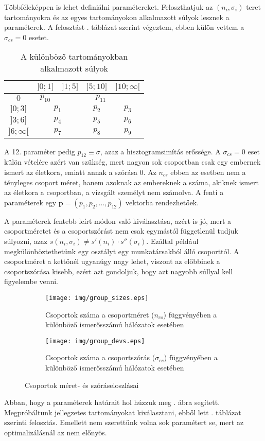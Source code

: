 \documentclass[12pt]{article}
\begin{document}
Többféleképpen is lehet definiálni paramétereket. Feloszthatjuk az $(n_i, \sigma_i)$ teret tartományokra és az egyes tartományokon alkalmazott súlyok lesznek a paraméterek. A felosztást . táblázat szerint végeztem, ebben külön vettem a $\sigma_{cs} = 0$ esetet.
\begin{table}[H]
	\centering
	\begin{tabular}{|c|c|c|c|c|}
		\hline
		\diagbox{$\sigma_{cs}$}{$n_{cs}$} & $]0;1]$ & $]1;5]$ & $]5;10]$ & $]10;\infty[$  \\
		\hline
		$0$ & $p_{10}$ & \multicolumn{3}{|c|}{$p_{11}$} \\
		\hline
		$]0;3]$ & \multicolumn{2}{|c|}{$p_1$} & $p_2$ & $p_3$ \\
		\hline
		$]3;6]$ & \multicolumn{2}{|c|}{$p_4$} & $p_5$ & $p_6$ \\
		\hline
		$]6;\infty[$  & \multicolumn{2}{|c|}{$p_7$} & $p_8$ & $p_9$ \\
		\hline
	\end{tabular}
	\caption{A különböző tartományokban alkalmazott súlyok}
	\label{felosztas}
\end{table}
\noindent
A 12. paraméter pedig $p_{12} \equiv \sigma$, azaz a hisztogramsimítás erőssége. A $\sigma_{cs} = 0$ eset külön vételére azért van szükség, mert nagyon sok csoportban csak egy embernek ismert az életkora, emiatt annak a szórása $0$. Az $n_{cs}$ ebben az esetben nem a tényleges csoport méret, hanem azoknak az embereknek a száma, akiknek ismert az életkora a csoportban, a vizsgált személyt nem számolva.
A fenti a paraméterek egy $\mathbf{p} = (p_1, p_2, ..., p_{12})$ vektorba rendezhetőek.

A paraméterek fentebb leírt módon való kiválasztása, azért is jó, mert a csoportméretet és a csoportszórást nem csak egymástól függetlenül tudjuk súlyozni, azaz $s(n_i, \sigma_i) \neq s'(n_i)\cdot s''(\sigma_i)$. Ezáltal például megkülönböztethetünk egy osztályt egy munkatársakból álló csoporttól. A csoportméret a kettőnél ugyanúgy nagy lehet, viszont az előbbinek a csoportszórása kisebb, ezért azt gondoljuk, hogy azt nagyobb súllyal kell figyelembe venni.
\begin{figure}[H]
	\centering
	\begin{subfigure}{0.49\textwidth}
		\texttt{[image: img/group\_sizes.eps]}
		\caption{Csoportok száma a csoportméret ($n_{cs}$) függvényében a különböző ismerősszámú hálózatok esetében}
	\end{subfigure} \hfill
	\begin{subfigure}{0.49\textwidth}
		\texttt{[image: img/group\_devs.eps]}
		\caption{Csoportok száma a csoportszórás ($\sigma_{cs}$) függvényében a különböző ismerősszámú hálózatok esetében}
	\end{subfigure}
	\caption{Csoportok méret- és szóráseloszlásai}
	\label{meret_szoras_eloszlas}
\end{figure}
Abban, hogy a paraméterek határait hol húzzuk meg . ábra segített. Megpróbáltunk jellegzetes tartományokat kiválasztani, ebből lett . táblázat szerinti felosztás. Emellett nem szerettünk volna sok paramétert se, mert az optimalizálásnál az nem előnyös.
\end{document}
